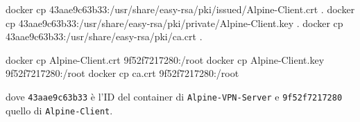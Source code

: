 \documentclass{article}
\newcommand{\varname}[1]{{\lstinline[basicstyle=\ttfamily\color{gray}]|#1|}}
\newcommand{\hostname}[1]{{\lstinline[basicstyle=\ttfamily\color{teal}]|#1|}}
\begin{document}
\begin{smallcommandshell}{}
docker cp 43aae9c63b33:/usr/share/easy-rsa/pki/issued/Alpine-Client.crt .
docker cp 43aae9c63b33:/usr/share/easy-rsa/pki/private/Alpine-Client.key .
docker cp 43aae9c63b33:/usr/share/easy-rsa/pki/ca.crt .
\end{smallcommandshell}

\begin{smallcommandshell}{}
docker cp Alpine-Client.crt 9f52f7217280:/root
docker cp Alpine-Client.key 9f52f7217280:/root
docker cp ca.crt 9f52f7217280:/root
\end{smallcommandshell}

dove \varname{43aae9c63b33} è l'ID del container di \hostname{Alpine-VPN-Server} e \varname{9f52f7217280} quello
di \hostname{Alpine-Client}.
\end{document}
